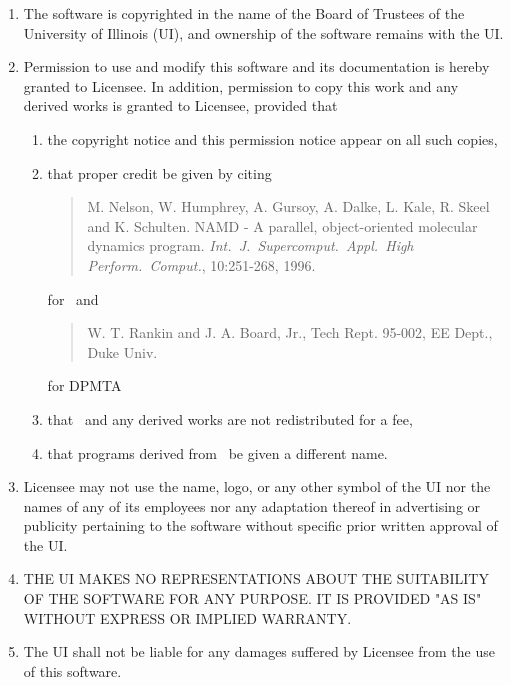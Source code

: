 \begin{enumerate}
\item The software is copyrighted in the name of the Board of Trustees
of the University of Illinois (UI), and ownership of the software
remains with the UI.

\item Permission to use and modify this software and its documentation
is hereby granted  to Licensee.  In addition,
permission to copy this work and any derived works is
granted to Licensee, provided that

\begin{enumerate}
\item the copyright notice and this permission notice appear on
all such copies, 
\item that proper credit be given by citing

\begin{quotation}
         \noindent M. Nelson, W. Humphrey, A. Gursoy, A. Dalke,
	 L. Kale, R. Skeel and K. Schulten.
	 NAMD - A parallel, object-oriented molecular dynamics program.
	 {\it Int.\ J.\ Supercomput.\ Appl.\ High Perform.\ Comput.}, 10:251-268, 1996.
\end{quotation}

\noindent for \NAMD\ and

\begin{quotation}
	 \noindent W. T. Rankin and J. A. Board, Jr., Tech Rept. 95-002,
	 EE Dept., Duke Univ.
\end{quotation}

\noindent for DPMTA
\item that \NAMD\ and any derived works are not redistributed for a fee,
\item that programs derived from \NAMD\ be given a different name.
\end{enumerate}

\item Licensee may not use the name, logo, or any other symbol of the UI
    nor the names of any of its employees nor any adaptation thereof in
    advertising or publicity pertaining to the software without specific
    prior written approval of the UI.

\item THE UI MAKES NO REPRESENTATIONS ABOUT THE SUITABILITY OF THE
    SOFTWARE FOR ANY PURPOSE.  IT IS PROVIDED "AS IS" WITHOUT EXPRESS
    OR IMPLIED WARRANTY.

\item The UI shall not be liable for any damages suffered by Licensee from
    the use of this software.
\end{enumerate}

